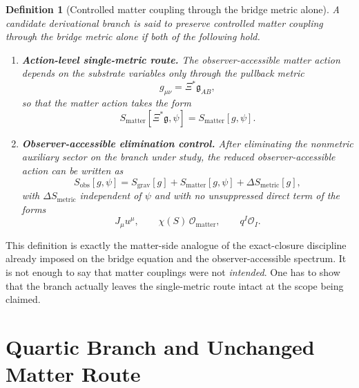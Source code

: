 \documentclass[11pt]{article}
\newcommand{\BridgeMetric}{\mathfrak{g}}
\newtheorem{definition}{Definition}
\begin{document}
\begin{definition}[Controlled matter coupling through the bridge metric alone]
A candidate derivational branch is said to preserve controlled matter coupling through the bridge metric alone if both of the following hold.
\begin{enumerate}
    \item \textbf{Action-level single-metric route.} The observer-accessible matter action depends on the substrate variables only through the pullback metric
    \begin{equation}
    g_{\mu\nu}=\Xi^*\BridgeMetric_{AB},
    \label{eq:gmatter}
    \end{equation}
    so that the matter action takes the form
    \begin{equation}
    S_{\mathrm{matter}}[\Xi^*\BridgeMetric,\psi]
    =
    S_{\mathrm{matter}}[g,\psi].
    \label{eq:matterroute}
    \end{equation}
    \item \textbf{Observer-accessible elimination control.} After eliminating the nonmetric auxiliary sector on the branch under study, the reduced observer-accessible action can be written as
    \begin{equation}
    S_{\mathrm{obs}}[g,\psi]
    =
    S_{\mathrm{grav}}[g]
    +
    S_{\mathrm{matter}}[g,\psi]
    +
    \Delta S_{\mathrm{metric}}[g],
    \label{eq:Sobsdef}
    \end{equation}
    with \(\Delta S_{\mathrm{metric}}\) independent of \(\psi\) and with no unsuppressed direct term of the forms
    \begin{equation}
    J_\mu u^\mu,
    \qquad
    \chi(S)\,\mathcal O_{\mathrm{matter}},
    \qquad
    q^I\mathcal O_I.
    \label{eq:forbidden}
    \end{equation}
\end{enumerate}
\end{definition}

This definition is exactly the matter-side analogue of the exact-closure discipline already imposed on the bridge equation and the observer-accessible spectrum. It is not enough to say that matter couplings were not \emph{intended}. One has to show that the branch actually leaves the single-metric route intact at the scope being claimed.

\section{Quartic Branch and Unchanged Matter Route}
\end{document}
